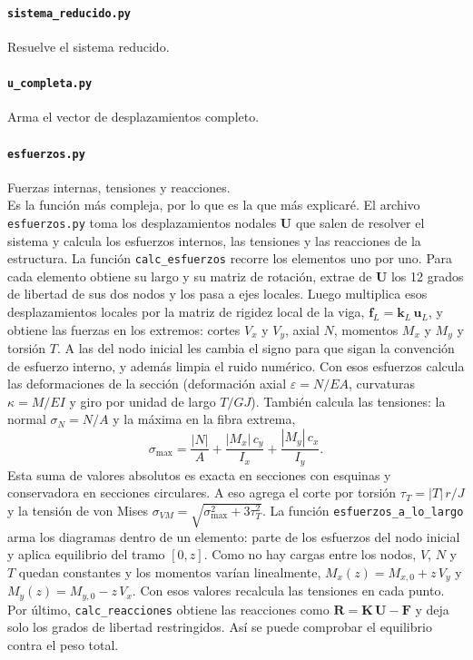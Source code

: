 \paragraph{\texttt{sistema\_reducido.py}} Resuelve el sistema reducido.


\paragraph{\texttt{u\_completa.py}} Arma el vector de desplazamientos completo.


\paragraph{\texttt{esfuerzos.py}} Fuerzas internas, tensiones y reacciones.\\
Es la función más compleja, por lo que es la que más explicaré. El archivo \texttt{esfuerzos.py} toma los desplazamientos nodales $\mathbf{U}$ que salen de resolver el sistema y calcula los esfuerzos internos, las tensiones y las reacciones de la estructura. La función \texttt{calc\_esfuerzos} recorre los elementos uno por uno. Para cada elemento obtiene su largo y su matriz de rotación, extrae de $\mathbf{U}$ los 12 grados de libertad de sus dos nodos y los pasa a ejes locales. Luego multiplica esos desplazamientos locales por la matriz de rigidez local de la viga, $\mathbf{f}_L = \mathbf{k}_L\,\mathbf{u}_L$, y obtiene las fuerzas en los extremos: cortes $V_x$ y $V_y$, axial $N$, momentos $M_x$ y $M_y$ y torsión $T$. A las del nodo inicial les cambia el signo para que sigan la convención de esfuerzo interno, y además limpia el ruido numérico. Con esos esfuerzos calcula las deformaciones de la sección (deformación axial $\varepsilon = N/EA$, curvaturas $\kappa = M/EI$ y giro por unidad de largo $T/GJ$). También calcula las tensiones: la normal $\sigma_N = N/A$ y la máxima en la fibra extrema,
\[
\sigma_{\max} = \frac{|N|}{A} + \frac{|M_x|\,c_y}{I_x} + \frac{|M_y|\,c_x}{I_y}.
\]
Esta suma de valores absolutos es exacta en secciones con esquinas y conservadora en secciones circulares. A eso agrega el corte por torsión $\tau_T = |T|\,r/J$ y la tensión de von Mises $\sigma_{VM} = \sqrt{\sigma_{\max}^2 + 3\tau_T^2}$. La función \texttt{esfuerzos\_a\_lo\_largo} arma los diagramas dentro de un elemento: parte de los esfuerzos del nodo inicial y aplica equilibrio del tramo $[0, z]$. Como no hay cargas entre los nodos, $V$, $N$ y $T$ quedan constantes y los momentos varían linealmente, $M_x(z) = M_{x,0} + z\,V_y$ y $M_y(z) = M_{y,0} - z\,V_x$. Con esos valores recalcula las tensiones en cada punto. Por último, \texttt{calc\_reacciones} obtiene las reacciones como $\mathbf{R} = \mathbf{K}\,\mathbf{U} - \mathbf{F}$ y deja solo los grados de libertad restringidos. Así se puede comprobar el equilibrio contra el peso total.

